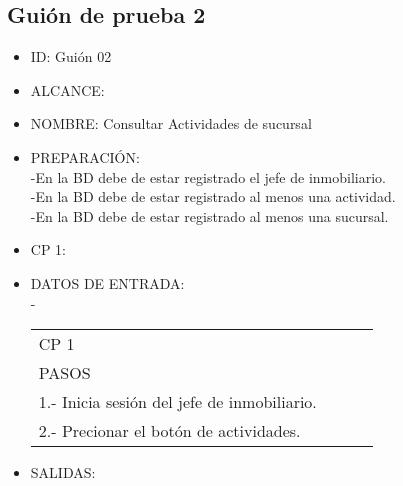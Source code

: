 \subsection{Guión de prueba 2}
\begin{itemize}
	\item ID: Guión 02
	\item ALCANCE: 
	\item NOMBRE: Consultar Actividades de sucursal  
	\item PREPARACIÓN:\\
	-En la BD debe de estar registrado el jefe de inmobiliario.\\
	-En la BD debe de estar registrado al menos una actividad.\\
	-En la BD debe de estar registrado al menos una sucursal.\\
	\item CP 1:
	\item DATOS DE ENTRADA:\\
	-
	\begin{center}			
		\begin{tabular}{|l|l|l|l|}
			\hline
			CP 1\\
			PASOS\\
			\hline 1.- Inicia sesión del jefe de inmobiliario.\\
			\hline 2.- Precionar el botón de actividades.\\
			\hline
		\end{tabular}
	\end{center}
	\item SALIDAS: \label{CU1LoginJI}
	
\end{itemize}

